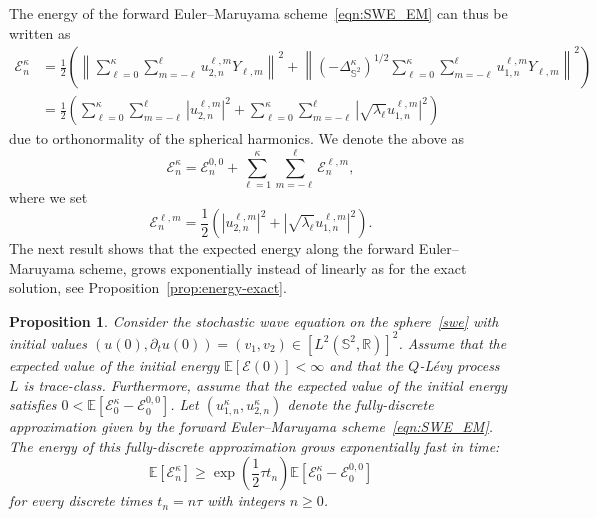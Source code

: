 \documentclass[11pt]{amsart}
\newtheorem{proposition}[theorem]{Proposition}
\newcommand{\R}{{\mathbb R}}
\newcommand{\E}{{\mathbb E}}
\newcommand{\IS}{\mathbb{S}}
\newcommand{\cE}{\mathcal E}
\providecommand{\norm}[1]{\left\lVert#1\right\rVert}
\begin{document}
The energy of the forward Euler--Maruyama scheme~\eqref{eqn:SWE_EM} can thus be written as
\begin{align*}
\mathcal{E}^\kappa_n&=\frac12\left( \norm{\sum_{\ell = 0}^{\kappa} \sum_{m=-\ell}^{\ell} u_{2,n}^{\ell, m} Y_{\ell, m} }^2
+\norm{(-\Delta_{\IS^2}^\kappa)^{1/2}\sum_{\ell = 0}^{\kappa} \sum_{m=-\ell}^{\ell} u_{1,n}^{\ell, m} Y_{\ell, m} }^2  \right)\\
&=\frac12\left( \sum_{\ell = 0}^{\kappa} \sum_{m=-\ell}^{\ell}\left| u_{2,n}^{\ell, m}\right|^2
+  \sum_{\ell = 0}^{\kappa} \sum_{m=-\ell}^{\ell} \left| \sqrt{\lambda_\ell} u_{1,n}^{\ell, m} \right|^2  \right)
\end{align*}
due to orthonormality of the spherical harmonics. We denote the above as
\begin{equation}\label{energEM}
\mathcal{E}^\kappa_n=\mathcal{E}^{0,0}_n+\sum_{\ell=1}^{\kappa}\sum_{m=-\ell}^{\ell} \mathcal{E}^{\ell,m}_n,
\end{equation}
where we set
$$
\mathcal{E}^{\ell,m}_n= \frac{1}{2}\left(\left| u_{2,n}^{\ell, m}\right|^2+\left| \sqrt{\lambda_\ell} u_{1,n}^{\ell, m} \right|^2\right).
$$
The next result shows that the expected energy along the forward Euler--Maruyama scheme, grows exponentially
instead of linearly as for the exact solution, see Proposition~\ref{prop:energy-exact}.
\begin{proposition}\label{prop:energy-em}
Consider the stochastic wave equation on the sphere~\eqref{swe} with initial values $(u(0),\partial_tu(0))=(v_1,v_2)\in [L^2(\IS^2,\R)]^2$.
Assume that the expected value of the initial energy $\E\left[\mathcal{E}(0)\right]<\infty$ and that the $Q$-L\'evy process $L$ is trace-class.
Furthermore, assume that the expected value of the initial energy satisfies $0<\E\left[\mathcal{E}^\kappa_0-\cE_0^{0,0}\right]$.
Let $(u_{1,n}^\kappa, u_{2,n}^\kappa)$ denote the fully-discrete approximation given by the forward Euler--Maruyama scheme~\eqref{eqn:SWE_EM}.
The energy of this fully-discrete approximation grows exponentially fast in time:
\begin{equation*}
\E\left[\mathcal{E}^\kappa_n\right] \geq \exp\left(\frac12\tau t_n\right)\E\left[\mathcal{E}^\kappa_0 - \mathcal{E}_0^{0,0}\right]
\end{equation*}
for every discrete times $t_n=n\tau$ with integers $n\geq0$.
\end{proposition}
\end{document}
